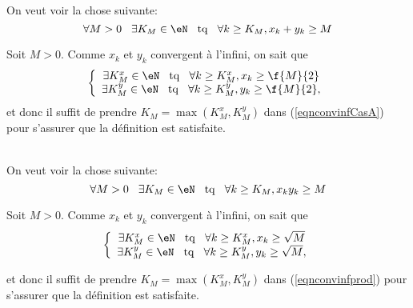\noindent On veut voir  la chose suivante:
\begin{equation}\label{eqnconvinfCasA}
	\forall M > 0 \hspace{0.3cm} \exists K_M \in \eN \hspace{0.3cm} {\rm tq} \hspace{0.3cm} \forall k \geq K_M, x_k + y_k \geq M
\end{equation}

\noindent Soit $M> 0$. Comme $x_k$ et $y_k$ convergent à l'infini, on sait que
\[\left\{\begin{array}{c}
		\exists K^x_M \in \eN \hspace{0.3cm} {\rm tq} \hspace{0.3cm} \forall k \geq K^x_M, x_k \geq \f{M}{2} \\
		\exists K^y_M \in \eN \hspace{0.3cm} {\rm tq} \hspace{0.3cm} \forall k \geq K^y_M, y_k \geq \f{M}{2},
	\end{array}\right.\]
et donc il suffit de prendre $K_M = \max(K_M^x, K_M^y)$ dans (\ref{eqnconvinfCasA}) pour s'assurer que la définition est satisfaite.


\vspace{0.5cm}
\\

\noindent On veut voir la chose suivante:
\begin{equation}
	\label{eqnconvinfprod}  \forall M > 0 \hspace{0.3cm} \exists K_M \in \eN \hspace{0.3cm} {\rm tq} \hspace{0.3cm} \forall k \geq K_M, x_k  y_k \geq M \end{equation}

\noindent Soit $M> 0$. Comme $x_k$ et $y_k$ convergent à l'infini, on sait que
\[\left\{\begin{array}{c}
		\exists K^x_M \in \eN \hspace{0.3cm} {\rm tq} \hspace{0.3cm} \forall k \geq K^x_M, x_k \geq \sqrt M \\
		\exists K^y_M \in \eN \hspace{0.3cm} {\rm tq} \hspace{0.3cm} \forall k \geq K^y_M, y_k \geq \sqrt M,
	\end{array}\right.\]

\noindent et donc il suffit  de prendre  $K_M = \max(K_M^x, K_M^y)$ dans (\ref{eqnconvinfprod}) pour s'assurer que la définition est satisfaite.

